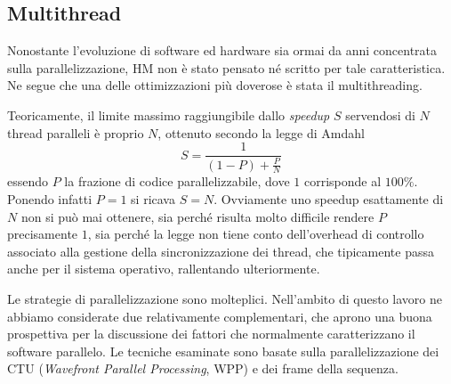 \label{sect-multi}\subsection{Multithread}
Nonostante l'evoluzione di software ed hardware sia ormai da anni concentrata 
sulla parallelizzazione, HM non è stato pensato né scritto per tale 
caratteristica. Ne segue che una delle ottimizzazioni più doverose è stata il 
multithreading.
\par Teoricamente, il limite massimo raggiungibile dallo \emph{speedup} $S$ 
servendosi 
di $N$ thread paralleli è proprio $N$, ottenuto secondo la legge di Amdahl
$$S = \frac{1}{(1-P)+\frac{P}{N}}$$
essendo $P$ la frazione di codice parallelizzabile, dove $1$ corrisponde al 
$100\%$. Ponendo infatti $P = 1$ si ricava $S = N$. Ovviamente uno speedup 
esattamente di $N$ non si può mai ottenere, sia perché risulta molto difficile 
rendere 
$P$ precisamente $1$, sia perché la legge non tiene conto dell'overhead di 
controllo associato alla gestione della sincronizzazione dei thread, che 
tipicamente passa anche per il sistema operativo, rallentando ulteriormente.
\par Le strategie di parallelizzazione sono molteplici. Nell'ambito di questo 
lavoro ne abbiamo considerate due relativamente complementari, che aprono
una buona prospettiva per la discussione dei fattori che normalmente 
caratterizzano il software parallelo. Le tecniche esaminate sono basate sulla 
parallelizzazione dei CTU (\emph{Wavefront Parallel Processing}, WPP) e dei 
frame della sequenza.


